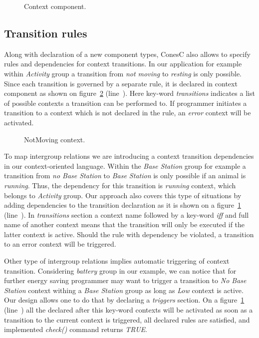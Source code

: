 
\begin{figure}[!h]
\TheSbox
\caption{Context component.}
\label{fig:cc}
\end{figure}

\subsection{Transition rules}

Along with declaration of a new component types, ConesC also allows to specify
rules and dependencies for context transitions. In our application for example
within \emph{Activity} group a transition from \emph{not moving} to
\emph{resting} is only possible. Since each transition is governed by a separate
rule, it is declared in context component as shown on figure~\ref{fig:nmc}
(line~). Here key-word \emph{transitions} indicates a list
of possible contexts a transition can be performed to. If programmer initiates a
transition to a context which is not declared in the rule, an \emph{error}
context will be activated.


\begin{figure}[!h]
\TheSbox
\caption{NotMoving context.}
\label{fig:nmc}
\end{figure}

To map intergroup relations we are introducing a context transition dependencies
in our context-oriented language. Within the \emph{Base Station} group for
example a transition from \emph{no Base Station} to \emph{Base Station} is only
possible if an animal is \emph{running}. Thus, the dependency for this
transition is \emph{running} context, which belongs to \emph{Activity} group.
Our approach also covers this type of situations by adding dependencies to the
transition declaration as it is shown on a figure~\ref{fig:cc}
(line~). In \emph{transitions} section a context name
followed by a key-word \emph{iff} and full name of another context means that
the transition will only be executed if the latter context is active. Should the
rule with dependency be violated, a transition to an error context will be
triggered.

Other type of intergroup relations implies automatic triggering of context
transition. Considering \emph{battery} group in our example, we can notice that
for further energy saving programmer may want to trigger a transition to
\emph{No Base Station} context withing a \emph{Base Station} group as long as
\emph{Low} context is active. Our design allows one to do that by declaring a
\emph{triggers} section. On a figure~\ref{fig:cc} (line~) all
the declared after this key-word contexts will be activated as soon as a
transition to the current context is triggered, all declared rules are
satisfied, and implemented \emph{check()} command returns \emph{TRUE}.

